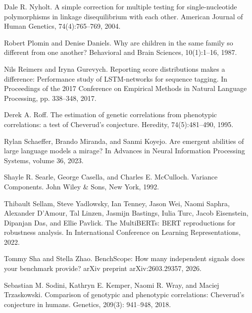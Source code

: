 \noindent Dale R. Nyholt. A simple correction for multiple testing for single-nucleotide polymorphisms in linkage disequilibrium with each other. American Journal of Human Genetics, 74(4):765--769, 2004.\par\medskip

\noindent Robert Plomin and Denise Daniels. Why are children in the same family so different from one another? Behavioral and Brain Sciences, 10(1):1--16, 1987.\par\medskip

\noindent Nils Reimers and Iryna Gurevych. Reporting score distributions makes a difference: Performance study of LSTM-networks for sequence tagging. In Proceedings of the 2017 Conference on Empirical Methods in Natural Language Processing, pp. 338--348, 2017.\par\medskip

\noindent Derek A. Roff. The estimation of genetic correlations from phenotypic correlations: a test of Cheverud's conjecture. Heredity, 74(5):481--490, 1995.\par\medskip

\noindent Rylan Schaeffer, Brando Miranda, and Sanmi Koyejo. Are emergent abilities of large language models a mirage? In Advances in Neural Information Processing Systems, volume 36, 2023.\par\medskip

\noindent Shayle R. Searle, George Casella, and Charles E. McCulloch. Variance Components. John Wiley \& Sons, New York, 1992.\par\medskip

\noindent Thibault Sellam, Steve Yadlowsky, Ian Tenney, Jason Wei, Naomi Saphra, Alexander D'Amour, Tal Linzen, Jasmijn Bastings, Iulia Turc, Jacob Eisenstein, Dipanjan Das, and Ellie Pavlick. The MultiBERTs: BERT reproductions for robustness analysis. In International Conference on Learning Representations, 2022.\par\medskip

\noindent Tommy Sha and Stella Zhao. BenchScope: How many independent signals does your benchmark provide? arXiv preprint arXiv:2603.29357, 2026.\par\medskip

\noindent Sebastian M. Sodini, Kathryn E. Kemper, Naomi R. Wray, and Maciej Trzaskowski. Comparison of genotypic and phenotypic correlations: Cheverud's conjecture in humans. Genetics, 209(3): 941--948, 2018.\par\medskip

